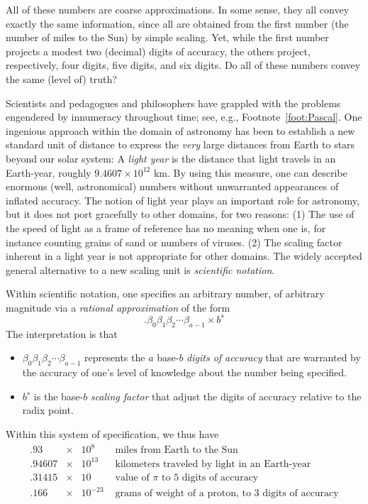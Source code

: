 \medskip

All of these numbers are coarse approximations.  In some sense, they
all convey exactly the same information, since all are obtained from
the first number (the number of miles to the Sun) by simple scaling.
Yet, while the first number projects a modest two (decimal) digits of
accuracy, the others project, respectively, four digits, five digits,
and six digits.  Do all of these numbers convey the same (level of)
truth?

\medskip

Scientists and pedagogues and philosophers have grappled with the
problems engendered by innumeracy throughout time; see, e.g.,
Footnote~\ref{foot:Pascal}.  One ingenious approach within the domain
of astronomy has been to establish a new standard unit of distance to
express the {\em very} large distances from Earth to stars beyond our
solar system: A {\em light year} is the distance that light travels in
an Earth-year, roughly $9.4607 \times 10^{12}$ km.  By using this
measure, one can describe enormous (well, astronomical) numbers
without unwarranted appearances of inflated accuracy.  The notion of
light year plays an important role for astronomy, but it does not port
gracefully to other domains, for two reasons: (1) The use of the speed
of light as a frame of reference has no meaning when one is, for
instance counting grains of sand or numbers of viruses.  (2) The
scaling factor inherent in a light year is not appropriate for other
domains.  The widely accepted general alternative to a new scaling
unit is {\em scientific notation}.  

Within scientific notation, one specifies an arbitrary number, of
arbitrary magnitude via a {\em rational approximation} of the form
\[ . \beta_0 \beta_1 \beta_2 \cdots \beta_{a-1} \times b^s \]
The interpretation is that
\begin{itemize}
\item
$\beta_0 \beta_1 \beta_2 \cdots \beta_{a-1}$ represents the $a$
  base-$b$ {\em digits of accuracy} that are warranted by the accuracy
  of one's level of knowledge about the number being specified.

\item
$b^s$ is the base-$b$ {\em scaling factor} that adjust the digits of
  accuracy relative to the radix point.
\end{itemize}
Within this system of specification, we thus have
\[ \begin{array}{lcll}
.93    & \times & 10^8     & \mbox{ miles from Earth to the Sun} \\
.94607 & \times & 10^{13}  & \mbox{ kilometers traveled by light in an Earth-year} \\
.31415 & \times & 10       & \mbox{ value of $\pi$ to $5$ digits of accuracy} \\
.166   & \times & 10^{-23} & \mbox{ grams of weight of a proton, to $3$ digits of accuracy}
\end{array}
\]

